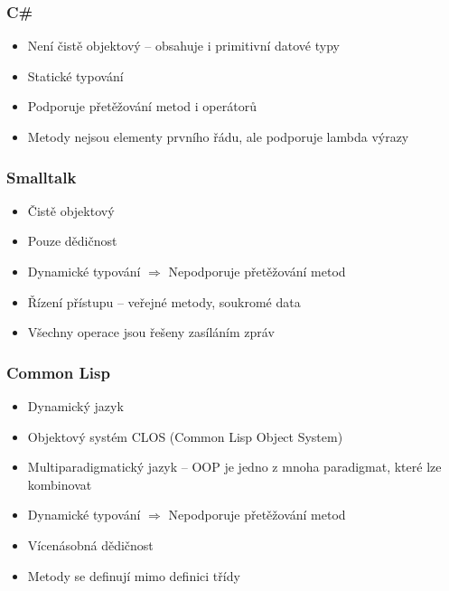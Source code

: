 \documentclass[10pt,a4paper]{article}
\begin{document}
		\subsubsection{C\#}
			\begin{itemize}
				\item{Není čistě objektový -- obsahuje i primitivní datové typy}
				\item{Statické typování}
				\item{Podporuje přetěžování metod i operátorů}
				\item{Metody nejsou elementy prvního řádu, ale podporuje lambda výrazy}
			\end{itemize}

		\subsubsection{Smalltalk}
			\begin{itemize}
				\item{Čistě objektový}
				\item{Pouze  dědičnost}
				\item{Dynamické typování $\Rightarrow$ Nepodporuje přetěžování metod}
				\item{Řízení přístupu -- veřejné metody, soukromé data}
				\item{Všechny operace jsou řešeny zasíláním zpráv}
			\end{itemize}

		\subsubsection{Common Lisp}
			\begin{itemize}
				\item{Dynamický jazyk}
				\item{Objektový systém CLOS (Common Lisp Object System)}
				\item{Multiparadigmatický jazyk -- OOP je jedno z mnoha paradigmat, které lze kombinovat}
				\item{Dynamické typování $\Rightarrow$ Nepodporuje přetěžování metod}
				\item{Vícenásobná dědičnost}
				\item{Metody se definují mimo definici třídy}
			\end{itemize}
\end{document}
